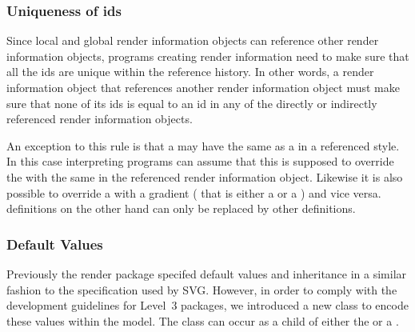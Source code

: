 \subsubsection{Uniqueness of ids}
Since local and global render information objects can reference other render information objects, programs creating
render information need to make sure that all the ids are unique within the reference history. In other words, a 
render information object that references another render information object must make sure that none of its ids is equal
to an id in any of the directly or indirectly referenced render information objects. 

An exception to this rule is that a \ColorDefinition may have the same  as a \ColorDefinition in a referenced style. In this case interpreting programs can assume that this \ColorDefinition is supposed to override the \ColorDefinition with the
same  in the referenced render information object. Likewise it is also possible to override a \ColorDefinition with a  gradient ( that is either a \LinearGradient or a \RadialGradient) and vice versa. \LineEnding definitions on the other hand can only be replaced by other \LineEnding definitions.

\subsubsection{Default Values}
\label{defaultvalues-class}
Previously the render package specifed default values and inheritance in a similar fashion to the specification used by SVG. However, in order to comply with the \SBML 
development guidelines for Level~3 packages, we introduced a new class \DefaultValues to encode these values within the model. 
The \DefaultValues class can occur as a child of either the \ListOfGlobalRenderInformation or a 
\ListOfLocalRenderInformation. 

